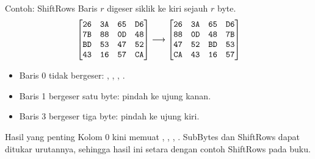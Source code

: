 \documentclass[aspectratio=169,11pt]{beamer}
\begin{document}
\begin{frame}{Contoh: ShiftRows}
    \footnotesize
    Baris $r$ digeser siklik ke kiri sejauh $r$ byte.
    \vspace{0.1cm}
    \[
        \begin{bmatrix}
            \texttt{26} & \texttt{3A} & \texttt{65} & \texttt{D6} \\
            \texttt{7B} & \texttt{88} & \texttt{0D} & \texttt{48} \\
            \texttt{BD} & \texttt{53} & \texttt{47} & \texttt{52} \\
            \texttt{43} & \texttt{16} & \texttt{57} & \texttt{CA}
        \end{bmatrix}
        \longrightarrow
        \begin{bmatrix}
            \texttt{26} & \texttt{3A} & \texttt{65} & \texttt{D6} \\
            \texttt{88} & \texttt{0D} & \texttt{48} & \texttt{7B} \\
            \texttt{47} & \texttt{52} & \texttt{BD} & \texttt{53} \\
            \texttt{CA} & \texttt{43} & \texttt{16} & \texttt{57}
        \end{bmatrix}
    \]
    \vspace{0.05cm}
    \begin{itemize}
        \item Baris 0 tidak bergeser: , ,
              , .
        \item Baris 1 bergeser satu byte:  pindah ke ujung kanan.
        \item Baris 3 bergeser tiga byte:  pindah ke ujung kiri.
    \end{itemize}
    \begin{alertblock}{Hasil yang penting}
        \scriptsize
        Kolom 0 kini memuat , , , .
        SubBytes dan ShiftRows dapat ditukar urutannya, sehingga hasil ini
        setara dengan contoh ShiftRows pada buku.
    \end{alertblock}
\end{frame}
\end{document}
